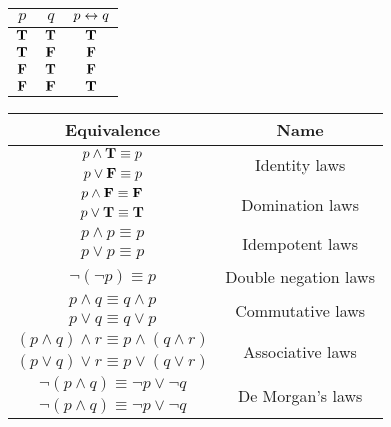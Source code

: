     \begin{center}
      \begin{tabular}{|c|c|c|}
        \hline
        $p$ & $q$ & $p \leftrightarrow q$ \\
        \hline
        $\mathbf{T}$ & $\mathbf{T}$ & $\mathbf{T}$ \\
        \hline
        $\mathbf{T}$ & $\mathbf{F}$ & $\mathbf{F}$ \\
        \hline
        $\mathbf{F}$ & $\mathbf{T}$ & $\mathbf{F}$ \\
        \hline
        $\mathbf{F}$ & $\mathbf{F}$ & $\mathbf{T}$ \\
        \hline
      \end{tabular}
    \end{center}

    \begin{center}
      \begin{tabular}{|c|c|}
        \hline
        \textbf{Equivalence} & \textbf{Name} \\
        \hline

        $p \land \mathbf{T} \equiv p$ & \multirow{2}{*}{Identity laws} \\
        $p \lor \mathbf{F} \equiv p$ & \\
        \hline

        $p \land \mathbf{F} \equiv \mathbf{F}$ & \multirow{2}{*}{Domination laws} \\
        $p \lor \mathbf{T} \equiv \mathbf{T}$ & \\
        \hline

        $p \land p \equiv p$ & \multirow{2}{*}{Idempotent laws} \\
        $p \lor p \equiv p$ & \\
        \hline

        $\lnot (\lnot p) \equiv p$ & Double negation laws \\
        \hline

        $p \land q \equiv q \land p$ & \multirow{2}{*}{Commutative laws} \\
        $p \lor q \equiv q \lor p$ & \\
        \hline

        $(p \land q) \land r \equiv p \land (q \land r)$
          & \multirow{2}{*}{Associative laws} \\
        $(p \lor q) \lor r \equiv p \lor (q \lor r)$ & \\
        \hline

        $\lnot (p \land q) \equiv \lnot p \lor \lnot q$
          & \multirow{2}{*}{De Morgan's laws} \\
        $\lnot (p \land q) \equiv \lnot p \lor \lnot q$ & \\
        \hline


\end{tabular}
\end{center}
